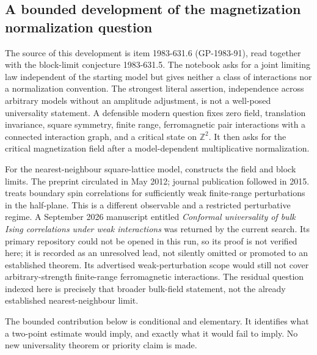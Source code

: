 \subsection{A bounded development of the magnetization normalization question}
\label{dev:ising}

The source of this development is item 1983-631.6 (GP-1983-91), read together with the block-limit conjecture 1983-631.5. The notebook asks for a joint limiting law independent of the starting model but gives neither a class of interactions nor a normalization convention. The strongest literal assertion, independence across arbitrary models without an amplitude adjustment, is not a well-posed universality statement. A defensible modern question fixes zero field, translation invariance, square symmetry, finite range, ferromagnetic pair interactions with a connected interaction graph, and a critical state on \(\mathbb Z^2\). It then asks for the critical magnetization field after a model-dependent multiplicative normalization.

For the nearest-neighbour square-lattice model, \citet[Theorem 1.3, Corollary 1.6, and Appendix A]{camia2015magnetization} constructs the field and block limits. The preprint circulated in May 2012; journal publication followed in 2015. \citet[Theorem 1.1]{cavagiulianigreenblatt2025boundary} treats boundary spin correlations for sufficiently weak finite-range perturbations in the half-plane. This is a different observable and a restricted perturbative regime. A September 2026 manuscript entitled \emph{Conformal universality of bulk Ising correlations under weak interactions} was returned by the current search. Its primary repository could not be opened in this run, so its proof is not verified here; it is recorded as an unresolved lead, not silently omitted or promoted to an established theorem. Its advertised weak-perturbation scope would still not cover arbitrary-strength finite-range ferromagnetic interactions. The residual question indexed here is precisely that broader bulk-field statement, not the already established nearest-neighbour limit.

The bounded contribution below is conditional and elementary. It identifies what a two-point estimate would imply, and exactly what it would fail to imply. No new universality theorem or priority claim is made.

